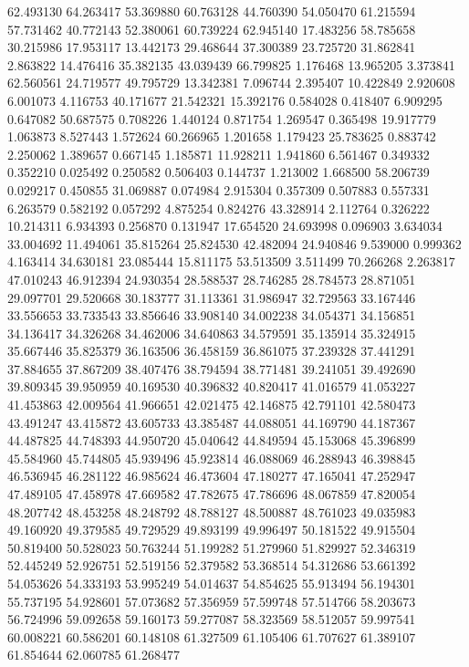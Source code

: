 62.493130
64.263417
53.369880
60.763128
44.760390
54.050470
61.215594
57.731462
40.772143
52.380061
60.739224
62.945140
17.483256
58.785658
30.215986
17.953117
13.442173
29.468644
37.300389
23.725720
31.862841
2.863822
14.476416
35.382135
43.039439
66.799825
1.176468
13.965205
3.373841
62.560561
24.719577
49.795729
13.342381
7.096744
2.395407
10.422849
2.920608
6.001073
4.116753
40.171677
21.542321
15.392176
0.584028
0.418407
6.909295
0.647082
50.687575
0.708226
1.440124
0.871754
1.269547
0.365498
19.917779
1.063873
8.527443
1.572624
60.266965
1.201658
1.179423
25.783625
0.883742
2.250062
1.389657
0.667145
1.185871
11.928211
1.941860
6.561467
0.349332
0.352210
0.025492
0.250582
0.506403
0.144737
1.213002
1.668500
58.206739
0.029217
0.450855
31.069887
0.074984
2.915304
0.357309
0.507883
0.557331
6.263579
0.582192
0.057292
4.875254
0.824276
43.328914
2.112764
0.326222
10.214311
6.934393
0.256870
0.131947
17.654520
24.693998
0.096903
3.634034
33.004692
11.494061
35.815264
25.824530
42.482094
24.940846
9.539000
0.999362
4.163414
34.630181
23.085444
15.811175
53.513509
3.511499
70.266268
2.263817
47.010243
46.912394
24.930354
28.588537
28.746285
28.784573
28.871051
29.097701
29.520668
30.183777
31.113361
31.986947
32.729563
33.167446
33.556653
33.733543
33.856646
33.908140
34.002238
34.054371
34.156851
34.136417
34.326268
34.462006
34.640863
34.579591
35.135914
35.324915
35.667446
35.825379
36.163506
36.458159
36.861075
37.239328
37.441291
37.884655
37.867209
38.407476
38.794594
38.771481
39.241051
39.492690
39.809345
39.950959
40.169530
40.396832
40.820417
41.016579
41.053227
41.453863
42.009564
41.966651
42.021475
42.146875
42.791101
42.580473
43.491247
43.415872
43.605733
43.385487
44.088051
44.169790
44.187367
44.487825
44.748393
44.950720
45.040642
44.849594
45.153068
45.396899
45.584960
45.744805
45.939496
45.923814
46.088069
46.288943
46.398845
46.536945
46.281122
46.985624
46.473604
47.180277
47.165041
47.252947
47.489105
47.458978
47.669582
47.782675
47.786696
48.067859
47.820054
48.207742
48.453258
48.248792
48.788127
48.500887
48.761023
49.035983
49.160920
49.379585
49.729529
49.893199
49.996497
50.181522
49.915504
50.819400
50.528023
50.763244
51.199282
51.279960
51.829927
52.346319
52.445249
52.926751
52.519156
52.379582
53.368514
54.312686
53.661392
54.053626
54.333193
53.995249
54.014637
54.854625
55.913494
56.194301
55.737195
54.928601
57.073682
57.356959
57.599748
57.514766
58.203673
56.724996
59.092658
59.160173
59.277087
58.323569
58.512057
59.997541
60.008221
60.586201
60.148108
61.327509
61.105406
61.707627
61.389107
61.854644
62.060785
61.268477
